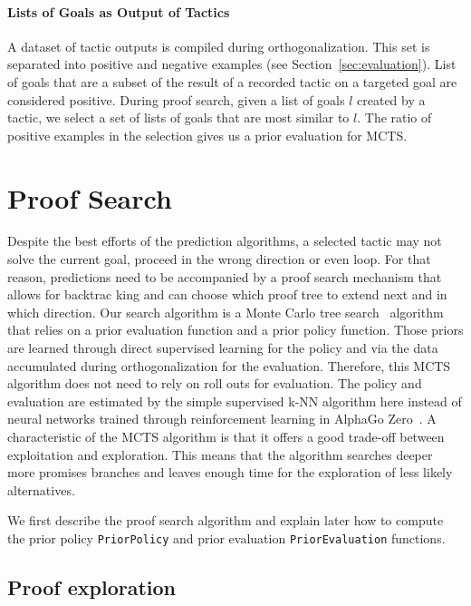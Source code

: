 \documentclass[runningheads,a4paper,draft]{svjour3}
\begin{document}
\paragraph{Lists of Goals as Output of Tactics}
A dataset of tactic outputs is compiled during orthogonalization.
This set is separated into positive and negative examples (see
Section~\ref{sec:evaluation}).
List of goals that are a subset of the result of a recorded tactic on a
targeted goal are considered positive. During proof search, given a list of
goals $l$ created by a tactic, we select a set of lists of goals that are most
similar to $l$. The ratio of positive examples in the selection gives us a
prior evaluation for MCTS.

\section{Proof Search}\label{sec:proofsearch}

Despite the best efforts of the prediction algorithms, a selected tactic may
not solve the current goal, proceed in the wrong direction
or even loop. For that reason, predictions need to be accompanied by a
proof search mechanism that allows for backtrac king and
can choose which proof tree to extend next and in which direction.
Our search algorithm is a Monte Carlo tree search~\cite{montecarlo} algorithm 
that relies
on a prior evaluation function and a prior policy function. Those priors are
learned through direct supervised learning for the policy and via the data
accumulated during orthogonalization for the evaluation. Therefore, this MCTS
algorithm does not need to rely on roll outs for evaluation. The
policy and evaluation are estimated by the simple supervised k-NN algorithm
here instead of neural networks trained through reinforcement learning in
AlphaGo Zero~\cite{silver2017mastering}.
A characteristic of the MCTS algorithm is that it offers a good trade-off
between exploitation and exploration. This means that the algorithm searches
deeper more promises branches and leaves enough time for the exploration
of less likely alternatives.


We first describe the proof search algorithm and explain later how to compute 
the prior policy \texttt{PriorPolicy} and prior evaluation 
\texttt{PriorEvaluation} functions.

\subsection{Proof exploration}
\end{document}

